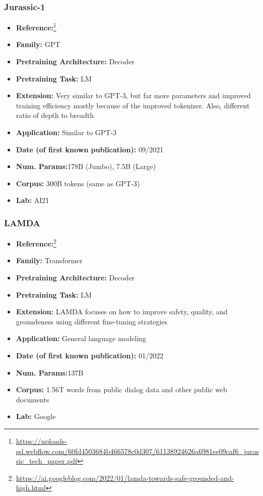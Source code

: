 \documentclass{article}
\begin{document}
\subsubsection{Jurassic-1}

            \begin{itemize}
                \item \textbf{Reference:}\footnote{\url{https://uploads-ssl.webflow.com/60fd4503684b466578c0d307/61138924626a6981ee09caf6_jurassic_tech_paper.pdf}}\cite{lieber2021jurassic}
                \item \textbf{Family:} GPT 
                \item \textbf{Pretraining Architecture:} Decoder
                \item \textbf{Pretraining Task:} LM
                \item \textbf{Extension:} Very similar to GPT-3, but far more parameters and improved training efficiency mostly because of the improved tokenizer. Also, different ratio of depth to breadth  
                \item \textbf{Application:} Similar to GPT-3
                \item \textbf{Date (of first known publication):} 09/2021
                \item \textbf{Num. Params:}178B (Jumbo), 7.5B (Large)
                \item \textbf{Corpus:} 300B tokens (same as GPT-3)
                \item \textbf{Lab:} AI21
            \end{itemize}
            
\subsubsection{LAMDA}

            \begin{itemize}
                \item \textbf{Reference:}\footnote{\url{https://ai.googleblog.com/2022/01/lamda-towards-safe-grounded-and-high.html}}\cite{thoppilan2022lamda}
                \item \textbf{Family:} Transformer 
                \item \textbf{Pretraining Architecture:} Decoder
                \item \textbf{Pretraining Task:} LM
                \item \textbf{Extension:} LAMDA focuses on how to improve safety, quality, and groundeness using different fine-tuning strategies  
                \item \textbf{Application:} General language modeling
                \item \textbf{Date (of first known publication):} 01/2022
                \item \textbf{Num. Params:}137B
                \item \textbf{Corpus:} 1.56T words from public dialog data and other public web documents
                \item \textbf{Lab:} Google
            \end{itemize}
\end{document}
